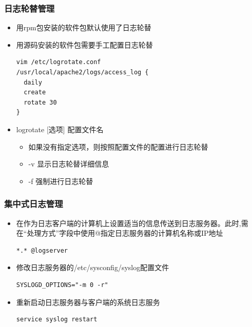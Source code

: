 \documentclass[xcolor=svgnames,presentation]{beamer}
\begin{document}
\begin{frame}[fragile]
\frametitle{日志轮替管理}
\label{sec-6-11}
\begin{itemize}

\item 用rpm包安装的软件包默认使用了日志轮替
\label{sec-6-11-1}%

\item 用源码安装的软件包需要手工配置日志轮替\\
\label{sec-6-11-2}%
\begin{verbatim}
vim /etc/logrotate.conf
/usr/local/apache2/logs/access_log {
  daily
  create
  rotate 30
}
\end{verbatim}

\item logrotate [选项] 配置文件名
\label{sec-6-11-3}%
\begin{itemize}

\item 如果没有指定选项，则按照配置文件的配置进行日志轮替
\label{sec-6-11-3-1}%

\item -v 显示日志轮替详细信息
\label{sec-6-11-3-2}%

\item -f 强制进行日志轮替
\label{sec-6-11-3-3}%
\end{itemize} %
\end{itemize} %
\end{frame}
\begin{frame}[fragile]
\frametitle{集中式日志管理}
\label{sec-6-12}
\begin{itemize}

\item 在作为日志客户端的计算机上设置适当的信息传送到日志服务器。此时,需在“处理方式”字段中使用@指定日志服务器的计算机名称或IP地址\\
\label{sec-6-12-1}%
\begin{verbatim}
*.* @logserver
\end{verbatim}

\item 修改日志服务器的/etc/sysconfig/syslog配置文件\\
\label{sec-6-12-2}%
\begin{verbatim}
SYSLOGD_OPTIONS="-m 0 -r"
\end{verbatim}

\item 重新启动日志服务器与客户端的系统日志服务\\
\label{sec-6-12-3}%
\begin{verbatim}
service syslog restart
\end{verbatim}
\end{itemize} %
\end{frame}
\end{document}
